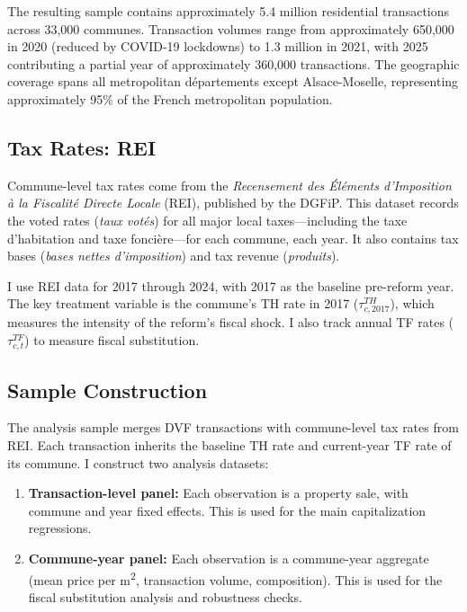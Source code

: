 \documentclass[12pt]{article}
\begin{document}
The resulting sample contains approximately 5.4 million residential transactions across 33,000 communes. Transaction volumes range from approximately 650,000 in 2020 (reduced by COVID-19 lockdowns) to 1.3 million in 2021, with 2025 contributing a partial year of approximately 360,000 transactions. The geographic coverage spans all metropolitan d\'epartements except Alsace-Moselle, representing approximately 95\% of the French metropolitan population.

\subsection{Tax Rates: REI}

Commune-level tax rates come from the \emph{Recensement des \'El\'ements d'Imposition \`a la Fiscalit\'e Directe Locale} (REI), published by the DGFiP. This dataset records the voted rates (\emph{taux vot\'es}) for all major local taxes---including the taxe d'habitation and taxe fonci\`ere---for each commune, each year. It also contains tax bases (\emph{bases nettes d'imposition}) and tax revenue (\emph{produits}).

I use REI data for 2017 through 2024, with 2017 as the baseline pre-reform year. The key treatment variable is the commune's TH rate in 2017 ($\tau^{TH}_{c,2017}$), which measures the intensity of the reform's fiscal shock. I also track annual TF rates ($\tau^{TF}_{c,t}$) to measure fiscal substitution.

\subsection{Sample Construction}

The analysis sample merges DVF transactions with commune-level tax rates from REI. Each transaction inherits the baseline TH rate and current-year TF rate of its commune. I construct two analysis datasets:

\begin{enumerate}
    \item \textbf{Transaction-level panel:} Each observation is a property sale, with commune and year fixed effects. This is used for the main capitalization regressions.
    \item \textbf{Commune-year panel:} Each observation is a commune-year aggregate (mean price per m\textsuperscript{2}, transaction volume, composition). This is used for the fiscal substitution analysis and robustness checks.
\end{enumerate}
\end{document}
